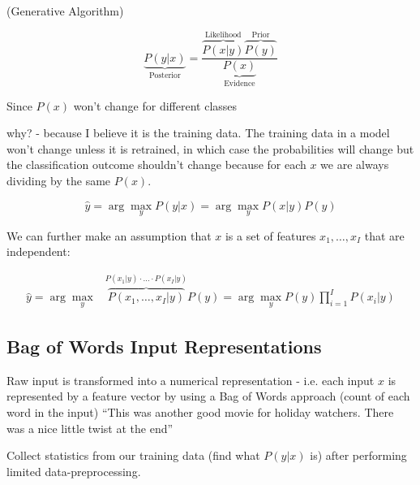 \documentclass[11pt]{article}
\begin{document}
(Generative Algorithm)

\begin{definition}
    \begin{equation*}
        \underbrace{P(y|x)}_\text{Posterior} = \frac{\overbrace{P(x|y)}^\text{Likelihood}\overbrace{P(y)}^\text{Prior}}{\underbrace{P(x)}_\text{Evidence}}
    \end{equation*}
\end{definition}

Since $P(x)$ won't change for different classes

\begin{warning}
    why? - because I believe it is the training data. The training data in a model won't change unless it is retrained, in which case the probabilities will change but the classification outcome shouldn't change because for each $x$ we are always dividing by the same $P(x)$.
\end{warning}

\begin{equation*}
    \hat{y} = \arg \max_y P(y|x) = \arg \max_y P(x|y)P(y)
\end{equation*}

We can further make an assumption that $x$ is a set of features $x_1, \ldots, x_I$ that are independent:

\begin{definition}\label{eq:naiive-bayes-classifier}
    \begin{align*}
        \hat{y} = \arg \max_y & \overbrace{P(x_1, \ldots, x_I|y)}^{P(x_1|y) \cdot \ldots \cdot P(x_I|y)}P(y) = \arg \max_y P(y) \prod ^ I _{i=1} P(x_i|y)
    \end{align*}
\end{definition}

\subsection{Bag of Words Input Representations}

Raw input is transformed into a numerical representation - i.e. each input $x$ is represented by a feature vector by using a Bag of Words approach (count of each word in the input)
``This was another good movie for holiday watchers. There was a nice little twist at the end''

Collect statistics from our training data (find what $P(y|x)$ is) after performing limited data-preprocessing.
\end{document}
